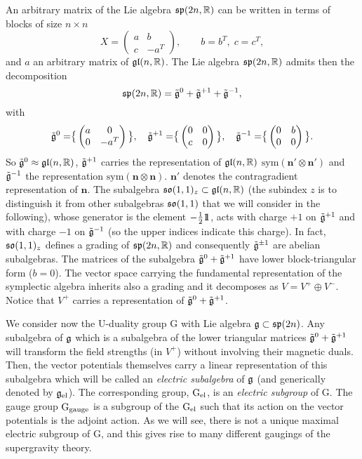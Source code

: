 \documentclass[a4paper,12pt]{article}
\begin{document}
An arbitrary matrix of the  Lie algebra $\mathfrak{sp}(2n, \mathbb{R})$ can be
written in terms of blocks of size $n\times n$
\begin{equation}\label{matrix}X=\begin{pmatrix}a&b\\c&-a^T\end{pmatrix},\qquad
b=b^T, \; c=c^T, \end{equation}
 and $a$ an arbitrary matrix of
$\mathfrak{gl}(n,\mathbb{R})$. The Lie algebra $\mathfrak{sp}(2n, \mathbb{R})$ admits then the
decomposition $$\mathfrak{sp}(2n,
\mathbb{R})=\tilde{\mathfrak{g}}^0+\tilde{\mathfrak{g}}^{+1}+\tilde{\mathfrak{g}}^{-1},$$ with
  $$\tilde{\mathfrak{g}}^0=\bigr\{\begin{pmatrix}a&0\\0&-a^T\end{pmatrix}\bigl\}, \quad
\tilde{\mathfrak{g}}^{+1}=\bigr\{\begin{pmatrix}0&0\\c&0\end{pmatrix}\bigl\}
,\quad
\tilde{\mathfrak{g}}^{-1}=\bigr\{\begin{pmatrix}0&b\\0&0\end{pmatrix}\bigl\}.$$
So $\tilde{\mathfrak{g}}^0\approx\mathfrak{gl}(n,\mathbb{R})$, $\tilde{\mathfrak{g}}^{+1}$ carries the
representation of $\mathfrak{gl}(n,\mathbb{R})$
$\mathrm{sym}(\mathbf{n'}\otimes\mathbf{n'})$
 and $\tilde{\mathfrak{g}}^{-1}$  the representation
$\mathrm{sym}(\mathbf{n}\otimes\mathbf{n})$. $\mathbf{n'}$ denotes
the contragradient representation of $\mathbf{n}$. The subalgebra
$\mathfrak{so}(1,1)_z\subset \mathfrak{gl}(n,\mathbb{R})$ (the subindex $z$ is to
distinguish it from other subalgebras $\mathfrak{so}(1,1)$ that we will
consider in the following), whose generator is the element
$-\frac{1}{2}\relax{\rm 1\kern-.35em 1}$, acts with charge $+1$ on $\tilde{\mathfrak{g}}^{+1}$ and
with charge $-1$ on $\tilde{\mathfrak{g}}^{-1}$ (so the upper indices
indicate this charge). In fact, $\mathfrak{so}(1,1)_z$ defines a grading of
$\mathfrak{sp}(2n, \mathbb{R})$ and consequently $\tilde{\mathfrak{g}}^{\pm 1}$ are abelian
subalgebras.
 The matrices of the subalgebra $\tilde{\mathfrak{g}}^0+\tilde{\mathfrak{g}}^{+1}$ have lower
block-triangular form ($b=0$). The vector space carrying the
fundamental representation of the symplectic algebra inherits also
a grading and it decomposes as $V=V^+ \oplus V^-$. Notice that
$V^+$ carries a representation of $\tilde{\mathfrak{g}}^0+\tilde{\mathfrak{g}}^{+1}$.

We consider now the U-duality group G with Lie algebra $\mathfrak{g}\subset
\mathfrak{sp}(2n)$. Any subalgebra of $\mathfrak{g}$ which is a subalgebra of the
lower triangular matrices $\tilde{\mathfrak{g}}^0+\tilde{\mathfrak{g}}^{+1}$ will
transform the field strengths (in $V^+$)  without involving their
magnetic duals. Then, the vector potentials themselves carry a
linear representation of this subalgebra which will be called an
{\it electric subalgebra} of $\mathfrak{g}$ (and generically denoted by
$\mathfrak{g}_{\mathrm{el}}$). The corresponding group,
$\mathrm{G}_{\mathrm{el}}$, is an {\it electric subgroup} of G. The gauge
group  $\mathrm{G}_{\mathrm{gauge}}$ is a subgroup of the
$\mathrm{G}_{\mathrm{el}}$ such that its action on the vector potentials
is the adjoint action. As we will see, there is not a unique
maximal electric subgroup of G, and this gives rise to many
different gaugings of the supergravity theory.
		
\end{document}

